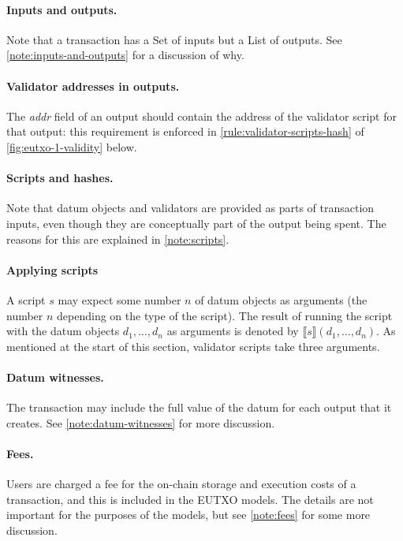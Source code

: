\documentclass[a4paper]{article}
\newcounter{note}
\newcommand{\applyScript}[1]{\ensuremath{\llbracket#1\rrbracket}}
\begin{document}
\paragraph{Inputs and outputs.} Note that a transaction has a
\textsf{Set} of inputs but a \textsf{List} of outputs. See
\cref{note:inputs-and-outputs} for a discussion of why.

\paragraph{Validator addresses in outputs.} The \textit{addr} field
of an output should contain the address of the validator script for
that output: this requirement is enforced in
\cref{rule:validator-scripts-hash} of
\cref{fig:eutxo-1-validity} below.

\paragraph{Scripts and hashes.} Note that datum objects and validators are
provided as parts of transaction inputs, even though they are
conceptually part of the output being spent.  The reasons for
this are explained in \cref{note:scripts}.

\paragraph{Applying scripts}  A script $s$ may expect some number $n$
of datum objects as arguments (the number $n$ depending on the type of
the script).  The result of running the script with the datum objects
$d_1,\ldots, d_n$ as arguments is denoted by
$\applyScript{s}(d_1,\ldots,d_n)$.  As mentioned at the start of this
section, validator scripts take three arguments.

\paragraph{Datum witnesses.} The transaction may include the full
value of the datum for each output that it creates.  See
\cref{note:datum-witnesses} for more discussion.

\paragraph{Fees.}  Users are charged a fee for the on-chain storage
and execution costs of a transaction, and this is included in the
EUTXO models.  The details are not important for the purposes of the
models, but see \cref{note:fees} for some more discussion.
\end{document}
